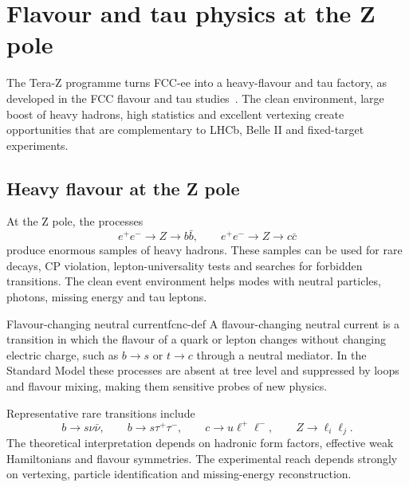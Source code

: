 \documentclass[11pt,a4paper]{article}
\numberwithin{equation}{section}
\begin{document}
\newpage
\section{Flavour and tau physics at the Z pole}
\begin{guidelinebox}
The Tera-Z programme turns FCC-ee into a heavy-flavour and tau factory, as developed in the FCC flavour and tau studies~\cite{WilkinsonFlavour2025,WilkinsonHeavyQuark2021,DamTau2021}. The clean environment, large boost of heavy hadrons, high statistics and excellent vertexing create opportunities that are complementary to LHCb, Belle II and fixed-target experiments.
\end{guidelinebox}

\subsection{Heavy flavour at the Z pole}
At the Z pole, the processes
\begin{equation}
  e^+e^-\to Z\to b\bar b,
  \qquad
  e^+e^-\to Z\to c\bar c
\end{equation}
produce enormous samples of heavy hadrons. These samples can be used for rare decays, CP violation, lepton-universality tests and searches for forbidden transitions. The clean event environment helps modes with neutral particles, photons, missing energy and tau leptons.

\begin{definition}{Flavour-changing neutral current}{fcnc-def}
A flavour-changing neutral current is a transition in which the flavour of a quark or lepton changes without changing electric charge, such as \(b\to s\) or \(t\to c\) through a neutral mediator. In the Standard Model these processes are absent at tree level and suppressed by loops and flavour mixing, making them sensitive probes of new physics.
\end{definition}

Representative rare transitions include
\begin{equation}
  b\to s\nu\bar\nu,
  \qquad
  b\to s\tau^+\tau^-,
  \qquad
  c\to u\ell^+\ell^-,
  \qquad
  Z\to \ell_i\ell_j .
\end{equation}
The theoretical interpretation depends on hadronic form factors, effective weak Hamiltonians and flavour symmetries. The experimental reach depends strongly on vertexing, particle identification and missing-energy reconstruction.
\end{document}
